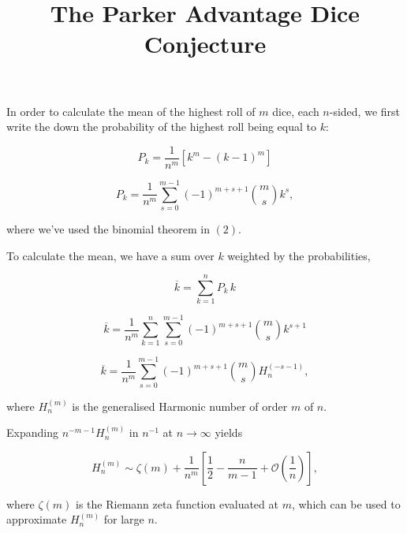\documentclass[12pt]{article}
\title{The Parker Advantage Dice Conjecture}
\author{}
\date{}
\begin{document}
\maketitle
\vspace{-0.8em}

In order to calculate the mean of the highest roll of $m$ dice, each $n$-sided, we first write the down the probability of the highest roll being equal to $k$:

\begin{equation}
    P_k
    = \frac{1}{n^m} \left[k^m - {\left(k - 1\right)}^m\right]
\end{equation}

\begin{equation}
    P_k
    = \frac{1}{n^m} \sum_{s=0}^{m-1} {\left(-1\right)}^{m+s+1} \binom{m}{s} k^s,
\end{equation}

where we've used the binomial theorem in $(2)$.
\newline

To calculate the mean, we have a sum over $k$ weighted by the probabilities,

\begin{equation}
    \overline{k}
    = \sum_{k=1}^n P_k \, k
\end{equation}

\begin{equation}
    \overline{k}
    = \frac{1}{n^m} \sum_{k=1}^n \sum_{s=0}^{m-1} {\left(-1\right)}^{m+s+1} \binom{m}{s} k^{s+1}
\end{equation}

\begin{equation}
    \overline{k}
    = \frac{1}{n^m} \sum_{s=0}^{m-1} {\left(-1\right)}^{m+s+1} \binom{m}{s} H_n^{\left(-s-1\right)},
\end{equation}

where $H_n^{\left(m\right)}$ is the generalised Harmonic number of order $m$ of $n$.
\newline

Expanding $n^{-m-1} H_n^{\left(m\right)}$ in $n^{-1}$ at $n \to \infty$ yields

\begin{equation}
    H_n^{\left(m\right)}
    \sim \zeta \left(m\right) + \frac{1}{n^m} \left[\frac{1}{2} - \frac{n}{m-1} + \mathcal{O} \left(\frac{1}{n}\right)\right],
\end{equation}

where $\zeta \left(m\right)$ is the Riemann zeta function evaluated at $m$, which can be used to approximate $H_n^{\left(m\right)}$ for large $n$.
\newline
\end{document}

